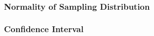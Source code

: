 \documentclass[handout]{beamer}
\newcommand{\blue}[1]{\textcolor{blue2}{#1}}
\newcommand{\xbar}{\overline{x}}
\begin{document}
\begin{frame}[fragile]
\frametitle{Normality of Sampling Distribution}
%
%
\end{frame}


\begin{frame}[fragile]
\frametitle{Confidence Interval}
%
%
\end{frame}
\end{document}
